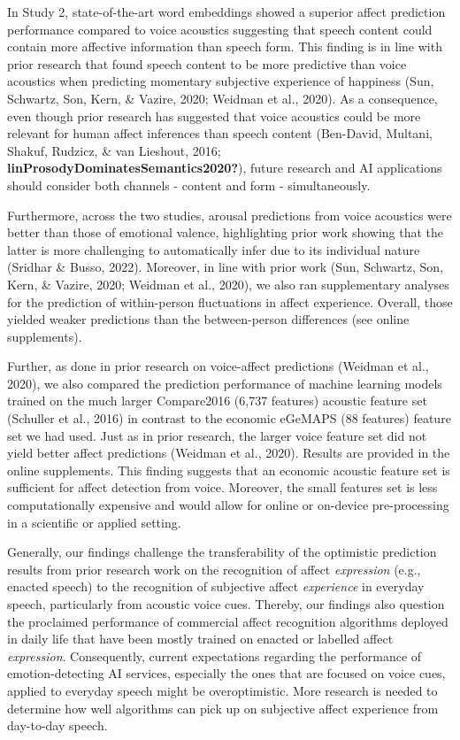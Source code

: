 \documentclass[
  english,
  man,floatsintext]{apa6}
\begin{document}
In Study 2, state-of-the-art word embeddings showed a superior affect prediction performance compared to voice acoustics suggesting that speech content could contain more affective information than speech form. This finding is in line with prior research that found speech content to be more predictive than voice acoustics when predicting momentary subjective experience of happiness (Sun, Schwartz, Son, Kern, \& Vazire, 2020; Weidman et al., 2020). As a consequence, even though prior research has suggested that voice acoustics could be more relevant for human affect inferences than speech content (Ben-David, Multani, Shakuf, Rudzicz, \& van Lieshout, 2016; \textbf{linProsodyDominatesSemantics2020?}), future research and AI applications should consider both channels - content and form - simultaneously.

Furthermore, across the two studies, arousal predictions from voice acoustics were better than those of emotional valence, highlighting prior work showing that the latter is more challenging to automatically infer due to its individual nature (Sridhar \& Busso, 2022). Moreover, in line with prior work (Sun, Schwartz, Son, Kern, \& Vazire, 2020; Weidman et al., 2020), we also ran supplementary analyses for the prediction of within-person fluctuations in affect experience. Overall, those yielded weaker predictions than the between-person differences (see online supplements).

Further, as done in prior research on voice-affect predictions (Weidman et al., 2020), we also compared the prediction performance of machine learning models trained on the much larger Compare2016 (6,737 features) acoustic feature set (Schuller et al., 2016) in contrast to the economic eGeMAPS (88 features) feature set we had used. Just as in prior research, the larger voice feature set did not yield better affect predictions (Weidman et al., 2020). Results are provided in the online supplements. This finding suggests that an economic acoustic feature set is sufficient for affect detection from voice. Moreover, the small features set is less computationally expensive and would allow for online or on-device pre-processing in a scientific or applied setting.

Generally, our findings challenge the transferability of the optimistic prediction results from prior research work on the recognition of affect \emph{expression} (e.g., enacted speech) to the recognition of subjective affect \emph{experience} in everyday speech, particularly from acoustic voice cues. Thereby, our findings also question the proclaimed performance of commercial affect recognition algorithms deployed in daily life that have been mostly trained on enacted or labelled affect \emph{expression}. Consequently, current expectations regarding the performance of emotion-detecting AI services, especially the ones that are focused on voice cues, applied to everyday speech might be overoptimistic. More research is needed to determine how well algorithms can pick up on subjective affect experience from day-to-day speech.
\end{document}
